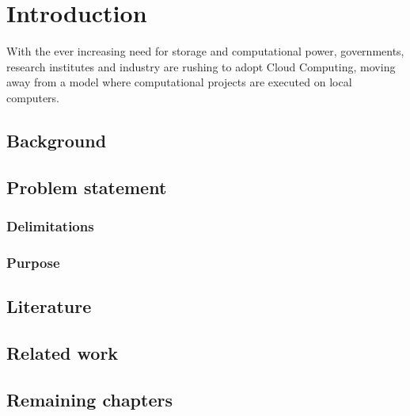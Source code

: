 \chapter{Introduction}
With the ever increasing need for storage and computational power,
governments, research institutes and industry are rushing to adopt
Cloud Computing, moving away from a model where computational projects
are executed on local computers.

\section{Background}


\section{Problem statement}

\subsection{Delimitations}
\subsection{Purpose}

\section{Literature}


\section{Related work}

\section{Remaining chapters}

